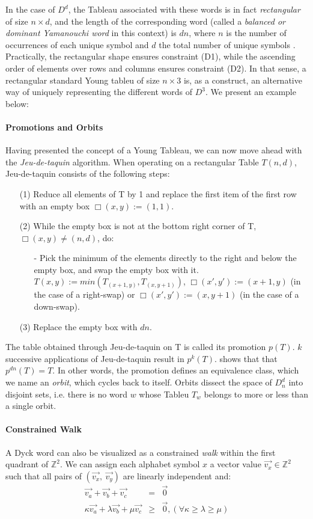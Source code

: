 \documentclass[nonatbib,numbers,10pt]{llncs}
\begin{document}
In the case of $D^d$, the Tableau associated with these words is in fact \textit{rectangular} of size $n \times d$, and the length of the corresponding word (called a \textit{balanced or dominant Yamanouchi word} in this context) is $dn$, where $n$ is the number of occurrences of each unique symbol and $d$ the total number of unique symbols \cite{moortgat}.
Practically, the rectangular shape ensures constraint (D1), while the ascending order of elements over rows and columns ensures constraint (D2). In that sense, a rectangular standard Young tableu of size $n \times 3$ is, as a construct, an alternative way of uniquely representing the different words of $D^3$. We present an example below:

\paragraph{Promotions and Orbits}
Having presented the concept of a Young Tableau, we can now move ahead with the \textit{Jeu-de-taquin} algorithm. When operating on a rectangular Table $T(n,d)$, Jeu-de-taquin consists of the following steps:
\begin{enumerate}
\item[(1)] Reduce all elements of T by 1 and replace the first item of the first row with an empty box $ \Box (x,y) := (1,1)$.
\item[(2)] While the empty box is not at the bottom right corner of T, $ \Box(x,y) \neq (n,d)$, do:
\begin{enumerate}
\item[-] Pick the minimum of the elements directly to the right and below the empty box, and swap the empty box with it. $ T(x, y) := min(T_{(x+1,y)}, T_{(x,y+1)})$, $ \Box (x',y') := (x+1, y)$ (in the case of a right-swap) or $\Box (x',y') := (x,y+1)$ (in the case of a down-swap).
\end{enumerate}
\item[(3)] Replace the empty box with $dn$.
\end{enumerate}

The table obtained through Jeu-de-taquin on T is called its promotion $p(T)$. $k$ successive applications of Jeu-de-taquin result in $p^k(T)$. \cite{petersen} shows that that $p^{dn}(T)=T$. In other words, the promotion defines an equivalence class, which we name an \textit{orbit}, which cycles back to itself. Orbits dissect the space of $D^d_n$ into disjoint sets, i.e. there is no word $w$ whose Tableu $T_w$ belongs to more or less than a single orbit.
\paragraph{Constrained Walk}
A Dyck word can also be visualized as a constrained \textit{walk} within the first quadrant of $\mathbb{Z}^2$. We can assign each alphabet symbol $x$ a vector value $\vec{v_x} \in \mathbb{Z}^2$ such that all pairs of $(\vec{v_x},\ \vec{v_y})$ are linearly independent and:
\begin{eqnarray}
\vec{v_a} + \vec{v_b} + \vec{v_c} &=& \vec{0} \\
\kappa\vec{v_a} + \lambda\vec{v_b} + \mu\vec{v_c} &\geq & \vec{0},  (\forall \kappa \geq \lambda \geq \mu)
\end{eqnarray}
\end{document}
